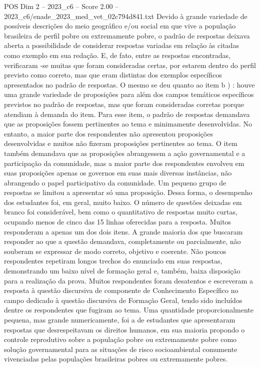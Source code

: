 \begin{textsample}{POS Dim 2 – 2023\_c6 – Score 2.00 – 2023\_c6/enade\_2023\_med\_vet\_02c794d841.txt}
Devido à grande variedade de possíveis descrições do meio geográfico e/ou social em que vive a população brasileira de perfil pobre ou extremamente pobre, o padrão de respostas deixava aberta a possibilidade de considerar respostas variadas em relação às citadas como exemplo em sua redação.
E, de fato, entre as respostas encontradas, verificaram -se muitas que foram consideradas certas, por estarem dentro do perfil previsto como correto, mas que eram distintas dos exemplos específicos apresentados no padrão de respostas.
O mesmo se deu quanto ao item b ) : houve uma grande variedade de proposições para além dos campos temáticos específicos previstos no padrão de respostas, mas que foram consideradas corretas porque atendiam à demanda do item.
Para esse item, o padrão de respostas demandava que as proposições fossem pertinentes ao tema e minimamente desenvolvidas.
No entanto, a maior parte dos respondentes não apresentou proposições desenvolvidas e muitos não fizeram proposições pertinentes ao tema.
O item também demandava que as proposições abrangessem a ação governamental e a participação da comunidade, mas a maior parte dos respondentes envolveu em suas proposições apenas os governos em suas mais diversas instâncias, não abrangendo o papel participativo da comunidade.
Um pequeno grupo de respostas se limitou a apresentar só uma proposição.
Dessa forma, o desempenho dos estudantes foi, em geral, muito baixo.
O número de questões deixadas em branco foi considerável, bem como o quantitativo de respostas muito curtas, ocupando menos de cinco das 15 linhas oferecidas para a resposta.
Muitos responderam a apenas um dos dois itens.
A grande maioria dos que buscaram responder ao que a questão demandava, completamente ou parcialmente, não souberam se expressar de modo correto, objetivo e coerente.
Não poucos respondentes repetiram longos trechos do enunciado em suas respostas, demonstrando um baixo nível de formação geral e, também, baixa disposição para a realização da prova.
Muitos respondentes foram desatentos e escreveram a resposta à questão discursiva de componente de Conhecimento Específico no campo dedicado à questão discursiva de Formação Geral, tendo sido incluídos dentre os respondentes que fugiram ao tema.
Uma quantidade proporcionalmente pequena, mas grande numericamente, foi a de estudantes que apresentaram respostas que desrespeitavam os direitos humanos, em sua maioria propondo o controle reprodutivo sobre a população pobre ou extremamente pobre como solução governamental para as situações de risco socioambiental comumente vivenciadas pelas populações brasileiras pobres ou extremamente pobres.

\end{textsample}
